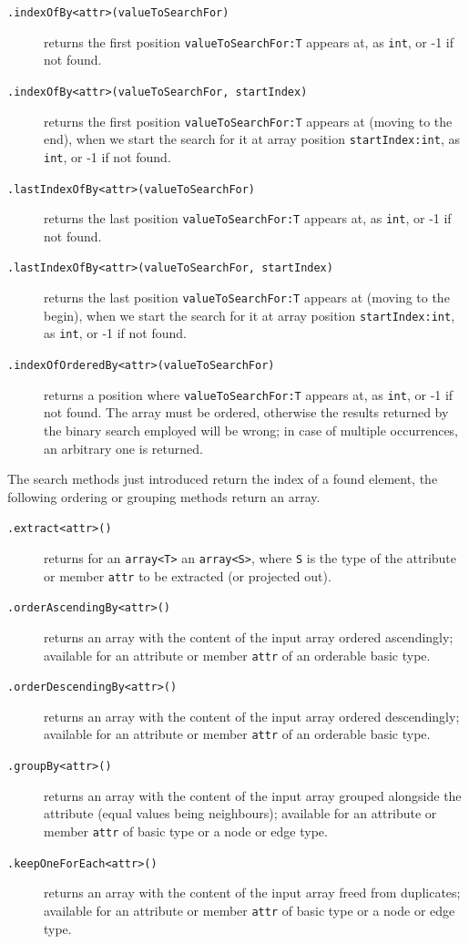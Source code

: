 \begin{description}
\item[\texttt{.indexOfBy<attr>(valueToSearchFor)}] returns the first position \texttt{valueToSearchFor:T} appears at, as \texttt{int}, or -1 if not found.
\item[\texttt{.indexOfBy<attr>(valueToSearchFor, startIndex)}] returns the first position \texttt{valueToSearchFor:T} appears at (moving to the end), when we start the search for it at array position \texttt{startIndex:int}, as \texttt{int}, or -1 if not found.
\item[\texttt{.lastIndexOfBy<attr>(valueToSearchFor)}] returns the last position \texttt{valueToSearchFor:T} appears at, as \texttt{int}, or -1 if not found.
\item[\texttt{.lastIndexOfBy<attr>(valueToSearchFor, startIndex)}] returns the last position \texttt{valueToSearchFor:T} appears at (moving to the begin), when we start the search for it at array position \texttt{startIndex:int}, as \texttt{int}, or -1 if not found.
\item[\texttt{.indexOfOrderedBy<attr>(valueToSearchFor)}] returns a position where \texttt{valueToSearchFor:T} appears at, as \texttt{int}, or -1 if not found. The array must be ordered, otherwise the results returned by the binary search employed will be wrong; in case of multiple occurrences, an arbitrary one is returned.
\end{description}

\noindent The search methods just introduced return the index of a found element, the following ordering or grouping methods return an array.

\begin{description}
\item[\texttt{.extract<attr>()}] returns for an \texttt{array<T>} an \texttt{array<S>}, where \texttt{S} is the type of the attribute or member \texttt{attr} to be extracted (or projected out).
\item[\texttt{.orderAscendingBy<attr>()}] returns an array with the content of the input array ordered ascendingly; available for an attribute or member \texttt{attr} of an orderable basic type.
\item[\texttt{.orderDescendingBy<attr>()}] returns an array with the content of the input array ordered descendingly; available for an attribute or member \texttt{attr} of an orderable basic type.
\item[\texttt{.groupBy<attr>()}] returns an array with the content of the input array grouped alongside the attribute (equal values being neighbours); available for an attribute or member \texttt{attr} of basic type or a node or edge type.
\item[\texttt{.keepOneForEach<attr>()}] returns an array with the content of the input array freed from duplicates; available for an attribute or member \texttt{attr} of basic type or a node or edge type.
\end{description}\label{arraybymemberaccessmethod}

